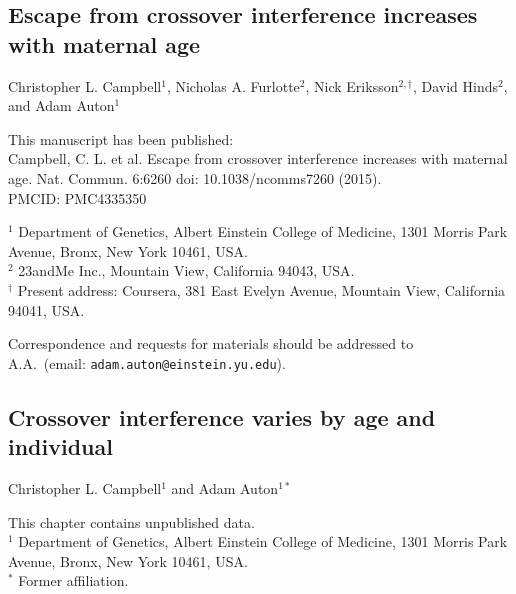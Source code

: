 \documentclass[11pt,twoside,openright,letterpaper]{memoir}
\begin{document}
\begin{SingleSpace}
\chapter{Escape from crossover interference increases with maternal age} \label{ch:cointEsc}

\noindent Christopher L. Campbell$^1$, Nicholas A. Furlotte$^2$, Nick Eriksson$^{2,\dagger}$, David Hinds$^2$, and Adam Auton$^1$

\vspace{0.5cm}
\noindent This manuscript has been published: \\
Campbell, C. L. et al. Escape from crossover interference increases with maternal age. Nat. Commun. 6:6260 doi: 10.1038/ncomms7260 (2015). \\
PMCID: PMC4335350

\vspace{0.5cm}
\noindent $^1$ Department of Genetics, Albert Einstein College of Medicine, 1301 Morris Park Avenue, Bronx, New York 10461, USA. \\
\noindent $^2$ 23andMe Inc., Mountain View, California 94043, USA. \\
\noindent $^\dagger$ Present address: Coursera, 381 East Evelyn Avenue, Mountain View, California 94041, USA. \\

\vspace{0.5cm}
\begin{centering}
    Correspondence and requests for materials should be addressed to \\
    A.A.\ (email: \texttt{adam.auton@einstein.yu.edu}). \\
\end{centering}
\end{SingleSpace}




\begin{SingleSpace}
\chapter{Crossover interference varies by age and individual} \label{ch:cointExtras}

\noindent Christopher L. Campbell$^1$ and Adam Auton$^{1*}$

\vspace{0.5cm}
\noindent This chapter contains unpublished data.\\

\vspace{0.5cm}
\noindent $^1$ Department of Genetics, Albert Einstein College of Medicine, 1301 Morris Park Avenue, Bronx, New York 10461, USA. \\
\noindent $^*$ Former affiliation.
\end{SingleSpace}
\end{document}
